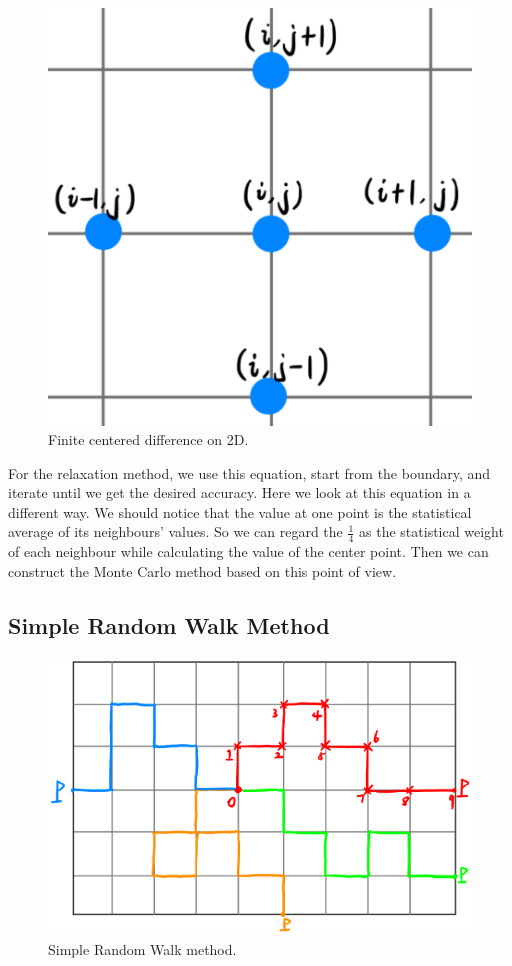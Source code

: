 \documentclass[aps, prl, preprint, groupedaddress]{revtex4-1}
\begin{document}
\begin{figure}[htbp]
    \centering
    \includegraphics[width=.6\textwidth]{./figs/disc}
    \caption{\label{fig:disc} Finite centered difference on 2D.}
\end{figure}

For the relaxation method, we use this equation, start from the boundary, and iterate until we get the desired accuracy. Here we look at this equation in a different way. We should notice that the value at one point is the statistical average of its neighbours' values. So we can regard the $\frac{1}{4}$ as the statistical weight of each neighbour while calculating the value of the center point. Then we can construct the Monte Carlo method based on this point of view.

\subsection{Simple Random Walk Method}

\begin{figure}[htbp]
    \centering
    \includegraphics[width=.8\textwidth]{./figs/srw}
    \caption{\label{fig:srw} Simple Random Walk method.}
\end{figure}
\end{document}
